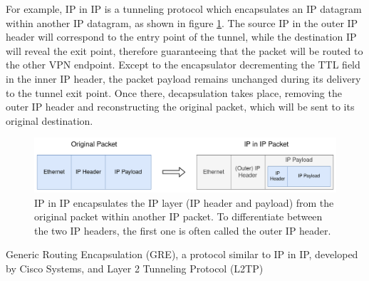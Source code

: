 \documentclass[a4paper,12pt]{report}
\begin{document}
		For example, IP in IP is a tunneling protocol which encapsulates an IP datagram within another IP datagram, as shown in figure \ref{fig:ip-in-ip_packet}. The source IP in the outer IP header will correspond to the entry point of the tunnel, while the destination IP will reveal the exit point, therefore guaranteeing that the packet will be routed to the other VPN endpoint. Except to the encapsulator decrementing the TTL field in the inner IP header, the packet payload remains unchanged during its delivery to the tunnel exit point\cite{perkins1996ip}. Once there, decapsulation takes place, removing the outer IP header and reconstructing the original packet, which will be sent to its original destination.
		\begin{figure}[h]
			\includegraphics[width=\textwidth]{ip-in-ip_packet}
			\centering
			\caption{IP in IP encapsulates the IP layer (IP header and payload) from the original packet within another IP packet. To differentiate between the two IP headers, the first one is often called the outer IP header.}
			\label{fig:ip-in-ip_packet}
		\end{figure}
		
		Generic Routing Encapsulation (GRE), a protocol similar to IP in IP, developed by Cisco Systems, and Layer 2 Tunneling Protocol (L2TP)



\end{document}
